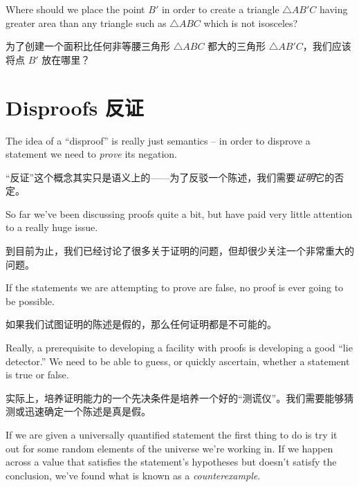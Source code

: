 \begin{exer}
      Where should we place the point $B'$ in order to create a triangle
      $\triangle AB'C$ having
      greater area than any triangle such as $\triangle ABC$ which is not isosceles?

      为了创建一个面积比任何非等腰三角形 $\triangle ABC$ 都大的三角形 $\triangle AB'C$，我们应该将点 $B'$ 放在哪里？
      \begin{center}
            
      \end{center}

\end{exer}
\clearpage




\newpage


\section{Disproofs 反证}
\label{sec:disproofs}

The idea of a ``disproof'' is really just semantics -- in order to
disprove a statement we need to \emph{prove} its negation.

“反证”这个概念其实只是语义上的——为了反驳一个陈述，我们需要\emph{证明}它的否定。

So far we've been discussing proofs quite a bit, but have paid
very little attention to a really huge issue.

到目前为止，我们已经讨论了很多关于证明的问题，但却很少关注一个非常重大的问题。

If the statements
we are attempting to prove are false, no proof is ever going to
be possible.

如果我们试图证明的陈述是假的，那么任何证明都是不可能的。

Really, a prerequisite to developing a facility with
proofs is developing a good ``lie detector.''   We need to be able to
guess, or quickly ascertain, whether a statement is true or false.

实际上，培养证明能力的一个先决条件是培养一个好的“测谎仪”。我们需要能够猜测或迅速确定一个陈述是真是假。

If we are given a universally quantified statement the first thing to
do is try it out for some random elements of the universe we're working
in.  If we happen across a value that satisfies the statement's hypotheses
but doesn't satisfy the conclusion, we've found what is known as a
\emph{counterexample}.

